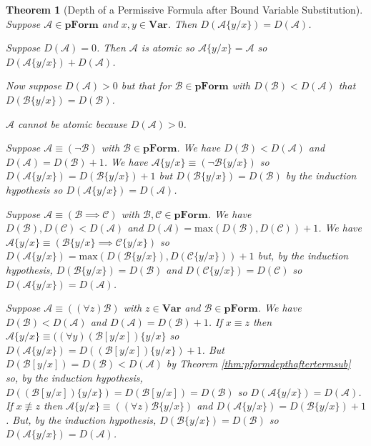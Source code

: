 \documentclass[12pt]{article}
\theoremstyle{break}
\theoremstyle{break}
\newtheorem{theorem}{Theorem}[section]
\theoremstyle{break}
\theoremstyle{break}
\theoremstyle{break}
\newtheorem{informal definition}[definition]{Informal Definition}
\newcommand{\mc}[1]{\mathcal{#1}}
\begin{document}
\begin{theorem}[Depth of a Permissive Formula after Bound Variable Substitution]
\label{thm:pformdepthafterqvsub}
Suppose $\mc{A}\in \textbf{pForm}$ and $x, y \in \textbf{Var}$.
Then $D(\mc{A}\{y/x\}) = D(\mc{A})$.

Suppose $D(\mc{A}) = 0$. Then $\mc{A}$ is atomic so $\mc{A}\{y/x\} = \mc{A}$ so $D(\mc{A}\{y/x\}) + D(\mc{A})$.

Now suppose $D(\mc{A}) > 0$ but that for $\mc{B}\in\textbf{pForm}$ with $D(\mc{B}) < D(\mc{A})$ that $D(\mc{B}\{y/x\}) = D(\mc{B})$.

$\mc{A}$ cannot be atomic because $D(\mc{A})>0$.

Suppose $\mc{A} \equiv (\lnot \mc{B})$ with $\mc{B}\in\textbf{pForm}$.
We have $D(\mc{B}) < D(\mc{A})$ and $D(\mc{A}) = D(\mc{B}) + 1$.
We have $\mc{A}\{y/x\} \equiv (\lnot \mc{B}\{y/x\})$ so $D(\mc{A}\{y/x\}) = D(\mc{B}\{y/x\}) + 1$ but $D(\mc{B}\{y/x\}) = D(\mc{B})$ by the induction hypothesis so $D(\mc{A}\{y/x\}) = D(\mc{A})$.

Suppose $\mc{A} \equiv (\mc{B}\implies \mc{C})$ with $\mc{B}, \mc{C}\in \textbf{pForm}$.
We have $D(\mc{B}), D(\mc{C}) < D(\mc{A})$ and $D(\mc{A}) = \text{max}(D(\mc{B}), D(\mc{C})) + 1$.
We have $\mc{A}\{y/x\} \equiv (\mc{B}\{y/x\} \implies \mc{C}\{y/x\})$ so $D(\mc{A}\{y/x\}) = \text{max}(D(\mc{B}\{y/x\}), D(\mc{C}\{y/x\})) + 1$ but, by the induction hypothesis, $D(\mc{B}\{y/x\}) = D(\mc{B})$ and $D(\mc{C}\{y/x\}) = D(\mc{C})$ so $D(\mc{A}\{y/x\}) = D(\mc{A})$.

Suppose $\mc{A} \equiv ((\forall z)\mc{B})$ with $z\in\textbf{Var}$ and $\mc{B}\in\textbf{pForm}$.
We have $D(\mc{B}) < D(\mc{A})$ and $D(\mc{A}) = D(\mc{B}) + 1$.
If $x\equiv z$ then $\mc{A}\{y/x\} \equiv ((\forall y)(\mc{B}[y/x])\{y/x\}$ so $D(\mc{A}\{y/x\}) = D((\mc{B}[y/x])\{y/x\}) + 1$.
But $D(\mc{B}[y/x]) = D(\mc{B})<D(\mc{A})$ by Theorem \ref{thm:pformdepthaftertermsub} so, by the induction hypothesis, $D((\mc{B}[y/x])\{y/x\}) = D(\mc{B}[y/x]) = D(\mc{B})$ so $D(\mc{A}\{y/x\}) = D(\mc{A})$.
If $x\not \equiv z$ then $\mc{A}\{y/x\} \equiv ((\forall z) \mc{B}\{y/x\})$ and $D(\mc{A}\{y/x\}) = D(\mc{B}\{y/x\}) + 1$.
But, by the induction hypothesis, $D(\mc{B}\{y/x\}) = D(\mc{B})$ so $D(\mc{A}\{y/x\}) = D(\mc{A})$.

\end{theorem}
\end{document}
